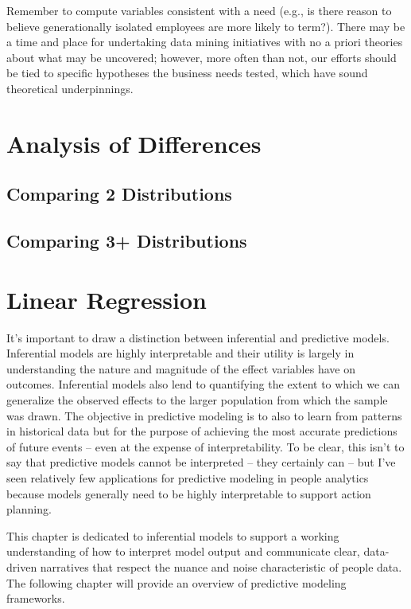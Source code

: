 \documentclass[]{book}
\begin{document}
Remember to compute variables consistent with a need (e.g., is there reason to believe generationally isolated employees are more likely to term?). There may be a time and place for undertaking data mining initiatives with no a priori theories about what may be uncovered; however, more often than not, our efforts should be tied to specific hypotheses the business needs tested, which have sound theoretical underpinnings.

\hypertarget{aod}{%
\chapter{Analysis of Differences}\label{aod}}

\hypertarget{comparing-2-distributions}{%
\section{Comparing 2 Distributions}\label{comparing-2-distributions}}

\hypertarget{comparing-3-distributions}{%
\section{Comparing 3+ Distributions}\label{comparing-3-distributions}}

\hypertarget{linear-regression}{%
\chapter{Linear Regression}\label{linear-regression}}

It's important to draw a distinction between inferential and predictive models. Inferential models are highly interpretable and their utility is largely in understanding the nature and magnitude of the effect variables have on outcomes. Inferential models also lend to quantifying the extent to which we can generalize the observed effects to the larger population from which the sample was drawn. The objective in predictive modeling is to also to learn from patterns in historical data but for the purpose of achieving the most accurate predictions of future events -- even at the expense of interpretability. To be clear, this isn't to say that predictive models cannot be interpreted -- they certainly can -- but I've seen relatively few applications for predictive modeling in people analytics because models generally need to be highly interpretable to support action planning.

This chapter is dedicated to inferential models to support a working understanding of how to interpret model output and communicate clear, data-driven narratives that respect the nuance and noise characteristic of people data. The following chapter will provide an overview of predictive modeling frameworks.
\end{document}
